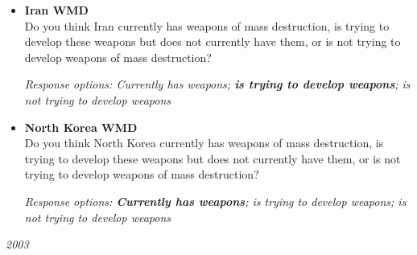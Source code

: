 \documentclass[12pt, letterpaper]{article}
\begin{document}
  \begin{itemize}
\item \textbf{Iran WMD}\\
Do you think Iran currently has weapons of mass destruction, is trying to develop these weapons but does not currently have them, or is not trying to develop weapons of mass destruction? 

\textit{Response options: Currently has weapons; \textbf{is trying to develop weapons}; is not trying to develop weapons} \\
\end{itemize}

  \begin{itemize}
\item \textbf{North Korea WMD}\\
Do you think North Korea currently has weapons of mass destruction, is trying to develop these weapons but does not currently have them, or is not trying to develop weapons of mass destruction? 

\textit{Response options: \textbf{Currently has weapons}; is trying to develop weapons; is not trying to develop weapons} \\
\end{itemize}

 \large \noindent \textit{2003} 
\normalsize
  
\end{document}
